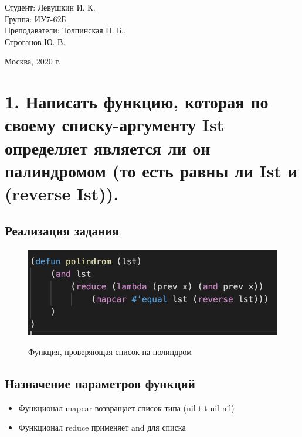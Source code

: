 \documentclass[a4paper,12pt]{article}
\begin{document}
	\vspace*{15mm} 	
	
	\large
	\begin{flushright}
		Студент: Левушкин И. К. \\
		Группа: ИУ7-62Б \\
		Преподаватели: Толпинская Н. Б., \\ Строганов Ю. В. \\
	\end{flushright}
	
	\vspace*{30mm}
	\begin{center}
		Москва, 2020 г.  
	\end{center}
	\thispagestyle{empty}
	
	
	\newpage
	
	\section*{1. Написать функцию, которая по своему списку-аргументу Ist определяет
является ли он палиндромом (то есть равны ли Ist и (reverse Ist)).
	 }
 
 	\subsection*{Реализация задания}
 	
 	\begin{figure}[h!]
 		\begin{center}
 			{\includegraphics[scale = 1.0]{1.png}}
 			\label{ris:1}
 		\end{center}
 		\caption{Функция, проверяющая список на полиндром}
 	\end{figure}
 	
 	\subsection*{Назначение параметров функций}
 	
 	\begin{itemize}
 		\item Функционал mapcar возвращает список типа (nil t t nil nil)
 		\item Функционал reduce применяет and для списка
 	\end{itemize}
 	
\end{document}
